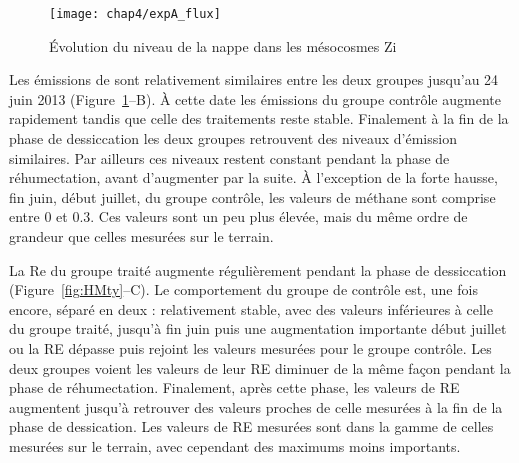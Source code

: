 \begin{figure}
\centering
\texttt{[image: chap4/expA\_flux]}
\caption{Évolution du niveau de la nappe dans les mésocosmes Zi}
\label{fig:HMzi}
\end{figure}



Les émissions de \chh sont relativement similaires entre les deux groupes jusqu'au 24 juin 2013 (Figure~\ref{fig:HMzi}--B).
À cette date les émissions du groupe contrôle augmente rapidement tandis que celle des traitements reste stable.
Finalement à la fin de la phase de dessiccation les deux groupes retrouvent des niveaux d'émission similaires.
Par ailleurs ces niveaux restent constant pendant la phase de réhumectation, avant d'augmenter par la suite.
À l'exception de la forte hausse, fin juin, début juillet, du groupe contrôle, les valeurs de méthane sont comprise entre 0 et \SI{0.3}{\uml}.
Ces valeurs sont un peu plus élevée, mais du même ordre de grandeur que celles mesurées sur le terrain.


La Re du groupe traité augmente régulièrement pendant la phase de dessiccation (Figure~\ref{fig:HMty}--C).
Le comportement du groupe de contrôle est, une fois encore, séparé en deux : relativement stable, avec des valeurs inférieures à celle du groupe traité, jusqu'à fin juin puis une augmentation importante début juillet ou la RE dépasse puis rejoint les valeurs mesurées pour le groupe contrôle.
Les deux groupes voient les valeurs de leur RE diminuer de la même façon pendant la phase de réhumectation.
Finalement, après cette phase, les valeurs de RE augmentent jusqu'à retrouver des valeurs proches de celle mesurées à la fin de la phase de dessication.
Les valeurs de RE mesurées sont dans la gamme de celles mesurées sur le terrain, avec cependant des maximums moins importants.

